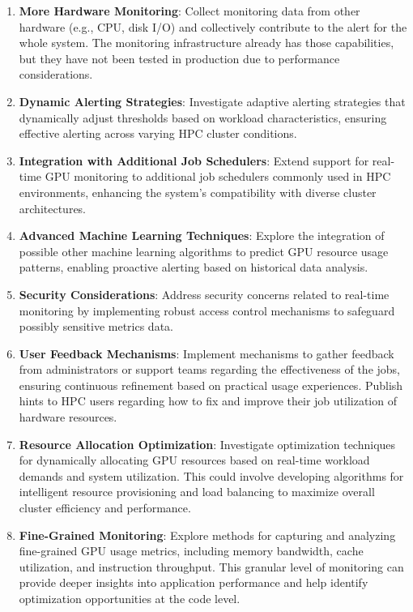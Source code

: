 \begin{enumerate}
    \item \textbf{More Hardware Monitoring}: Collect monitoring data from other hardware (e.g., CPU, disk I/O) and collectively contribute to the alert for the whole system. The monitoring infrastructure already has those capabilities, but they have not been tested in production due to performance considerations.
    \item \textbf{Dynamic Alerting Strategies}: Investigate adaptive alerting strategies that dynamically adjust thresholds based on workload characteristics, ensuring effective alerting across varying HPC cluster conditions.
    \item \textbf{Integration with Additional Job Schedulers}: Extend support for real-time GPU monitoring to additional job schedulers commonly used in HPC environments, enhancing the system's compatibility with diverse cluster architectures.
    \item \textbf{Advanced Machine Learning Techniques}: Explore the integration of possible other machine learning algorithms to predict GPU resource usage patterns, enabling proactive alerting based on historical data analysis.
    \item \textbf{Security Considerations}: Address security concerns related to real-time monitoring by implementing robust access control mechanisms to safeguard possibly sensitive metrics data.
    \item \textbf{User Feedback Mechanisms}: Implement mechanisms to gather feedback from administrators or support teams regarding the effectiveness of the jobs, ensuring continuous refinement based on practical usage experiences. Publish hints to HPC users regarding how to fix and improve their job utilization of hardware resources.
    \item \textbf{Resource Allocation Optimization}: Investigate optimization techniques for dynamically allocating GPU resources based on real-time workload demands and system utilization. This could involve developing algorithms for intelligent resource provisioning and load balancing to maximize overall cluster efficiency and performance.
    \item \textbf{Fine-Grained Monitoring}: Explore methods for capturing and analyzing fine-grained GPU usage metrics, including memory bandwidth, cache utilization, and instruction throughput. This granular level of monitoring can provide deeper insights into application performance and help identify optimization opportunities at the code level.

\end{enumerate}
